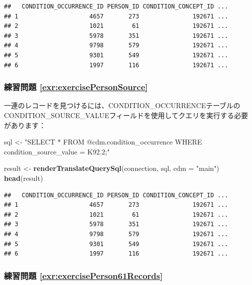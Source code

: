 \documentclass[
  11pt]{book}
\newenvironment{Shaded}{\begin{snugshade}}{\end{snugshade}}
\newcommand{\AttributeTok}[1]{\textcolor[rgb]{0.13,0.29,0.53}{#1}}
\newcommand{\FunctionTok}[1]{\textcolor[rgb]{0.13,0.29,0.53}{\textbf{#1}}}
\newcommand{\NormalTok}[1]{#1}
\newcommand{\OtherTok}[1]{\textcolor[rgb]{0.56,0.35,0.01}{#1}}
\newcommand{\StringTok}[1]{\textcolor[rgb]{0.31,0.60,0.02}{#1}}
\theoremstyle{definition}
\theoremstyle{definition}
\theoremstyle{definition}
\theoremstyle{definition}
\theoremstyle{remark}
\begin{document}
\begin{verbatim}
##   CONDITION_OCCURRENCE_ID PERSON_ID CONDITION_CONCEPT_ID ...
## 1                    4657       273               192671 ...
## 2                    1021        61               192671 ...
## 3                    5978       351               192671 ...
## 4                    9798       579               192671 ...
## 5                    9301       549               192671 ...
## 6                    1997       116               192671 ...
\end{verbatim}

\subsubsection*{練習問題 \ref{exr:exercisePersonSource}}\label{ux7df4ux7fd2ux554fux984c-refexrexercisepersonsource}

一連のレコードを見つけるには、CONDITION\_OCCURRENCEテーブルのCONDITION\_SOURCE\_VALUEフィールドを使用してクエリを実行する必要があります：

\begin{Shaded}
\begin{Highlighting}[]
\NormalTok{sql }\OtherTok{\textless{}{-}} \StringTok{"SELECT *}
\StringTok{FROM @cdm.condition\_occurrence}
\StringTok{WHERE condition\_source\_value = \textquotesingle{}K92.2\textquotesingle{};"}

\NormalTok{result }\OtherTok{\textless{}{-}} \FunctionTok{renderTranslateQuerySql}\NormalTok{(connection, sql, }\AttributeTok{cdm =} \StringTok{"main"}\NormalTok{)}
\FunctionTok{head}\NormalTok{(result)}
\end{Highlighting}
\end{Shaded}

\begin{verbatim}
##   CONDITION_OCCURRENCE_ID PERSON_ID CONDITION_CONCEPT_ID ...
## 1                    4657       273               192671 ...
## 2                    1021        61               192671 ...
## 3                    5978       351               192671 ...
## 4                    9798       579               192671 ...
## 5                    9301       549               192671 ...
## 6                    1997       116               192671 ...
\end{verbatim}

\subsubsection*{練習問題 \ref{exr:exercisePerson61Records}}\label{ux7df4ux7fd2ux554fux984c-refexrexerciseperson61records}
\end{document}
